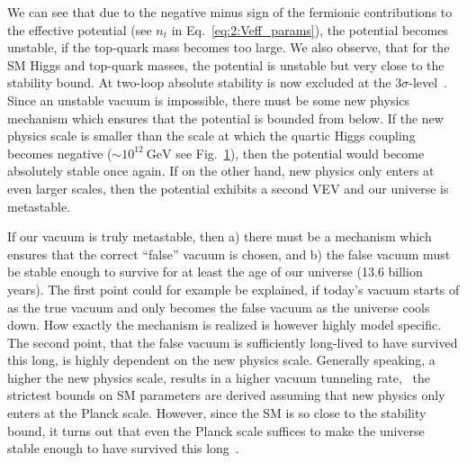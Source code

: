 \begin{figure}[h]
\begin{minipage}[t]{0.48\textwidth}
  \label{fig:2:running_couplings}
  \end{minipage}
\end{figure}
We can see that due to the negative minus sign of the fermionic contributions to the effective potential (see $n_t$ in Eq.~\eqref{eq:2:Veff_params}), the potential becomes unstable, if the top-quark mass becomes too large. We also observe, that for the \acs{SM} Higgs and top-quark masses, the potential is unstable but very close to the stability bound. At two-loop absolute stability is now excluded at the $3\sigma$-level~\cite{Degrassi:2012ry}. Since an unstable vacuum is impossible, there must be some new physics mechanism which ensures that the potential is bounded from below. If the new physics scale is smaller than the scale at which the quartic Higgs coupling becomes negative ($\sim 10^{12}\ \mathrm{GeV}$ see Fig.~\ref{fig:2:running_couplings}), then the potential would become absolutely stable once again. If on the other hand, new physics only enters at even larger scales, then the potential exhibits a second \acs{VEV} and our universe is metastable.

If our vacuum is truly metastable, then a) there must be a mechanism which ensures that the correct ``false'' vacuum is chosen, and b) the false vacuum must be stable enough to survive for at least the age of our universe (13.6 billion years). The first point could for example be explained, if today's vacuum starts of as the true vacuum and only becomes the false vacuum as the universe cools down. How exactly the mechanism is realized is however highly model specific. The second point, that the false vacuum is sufficiently long-lived to have survived this long, is highly dependent on the new physics scale. Generally speaking, a higher the new physics scale, results in a higher vacuum tunneling rate, \ie\ the strictest bounds on \acs{SM} parameters are derived assuming that new physics only enters at the Planck scale. However, since the \acs{SM} is so close to the stability bound, it turns out that even the Planck scale suffices to make the universe stable enough to have survived this long~\cite{Degrassi:2012ry}.
